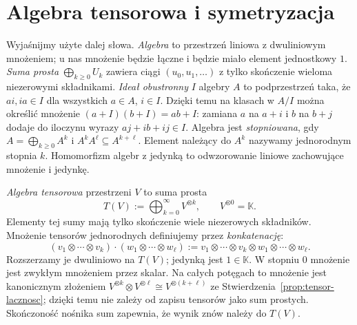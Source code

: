 \section{Algebra tensorowa i symetryzacja}
\label{sec:algebra-tensorowa}

Wyjaśnijmy użyte dalej słowa. \emph{Algebra} to przestrzeń
liniowa z dwuliniowym mnożeniem; u nas mnożenie będzie
łączne i będzie miało element jednostkowy $1$.
\emph{Suma prosta} $\bigoplus_{k\geq0}U_k$ zawiera ciągi
$(u_0,u_1,\ldots)$ z tylko skończenie wieloma niezerowymi
składnikami. \emph{Ideał obustronny} $I$ algebry $A$ to
podprzestrzeń taka, że $ai,ia\in I$ dla wszystkich
$a\in A$, $i\in I$. Dzięki temu na klasach w $A/I$
można określić mnożenie $(a+I)(b+I)=ab+I$:
zamiana $a$ na $a+i$ i $b$ na $b+j$ dodaje do
iloczynu wyrazy $aj+ib+ij\in I$. Algebra jest
\emph{stopniowana}, gdy $A=\bigoplus_{k\geq0}A^k$
i $A^kA^\ell\subseteq A^{k+\ell}$. Element należący do $A^k$ nazywamy
jednorodnym stopnia $k$. Homomorfizm algebr z jedynką to
odwzorowanie liniowe zachowujące mnożenie i jedynkę.

\begin{samepage}
\begin{definicja}
\label{def:algebra-tensorowa}
\emph{Algebra tensorowa} przestrzeni $V$ to suma prosta
\[
 T(V):=\bigoplus_{k=0}^{\infty}V^{\otimes k},
 \qquad V^{\otimes0}=\mathbb K.
\]
Elementy tej sumy mają tylko skończenie wiele niezerowych
składników. Mnożenie tensorów jednorodnych definiujemy przez
\emph{konkatenację}:
\[
 (v_1\otimes\cdots\otimes v_k)
 \cdot(w_1\otimes\cdots\otimes w_\ell)
 :=v_1\otimes\cdots\otimes v_k\otimes w_1\otimes\cdots\otimes w_\ell.
\]
Rozszerzamy je dwuliniowo na $T(V)$; jedynką jest $1\in\mathbb K$.
W stopniu $0$ mnożenie jest zwykłym mnożeniem przez skalar.
Na całych potęgach to mnożenie jest kanonicznym złożeniem
$V^{\otimes k}\otimes V^{\otimes\ell}\cong V^{\otimes(k+\ell)}$
ze Stwierdzenia~\ref{prop:tensor-lacznosc}; dzięki temu nie zależy
od zapisu tensorów jako sum prostych. Skończoność nośnika sum
zapewnia, że wynik znów należy do $T(V)$.
\end{definicja}
\end{samepage}

